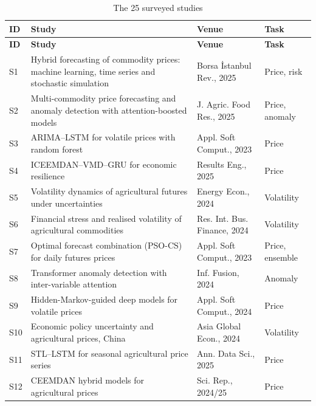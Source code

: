 {\footnotesize\setlength{\tabcolsep}{4pt}\renewcommand{\arraystretch}{1.15}
\begin{longtable}{|p{0.9cm}|p{7.7cm}|p{4.2cm}|p{2.7cm}|}
\caption{The 25 surveyed studies}\label{tab:survey-overview}\\
\hline \textbf{ID} & \textbf{Study} & \textbf{Venue} & \textbf{Task} \\ \hline \endfirsthead
\hline \textbf{ID} & \textbf{Study} & \textbf{Venue} & \textbf{Task} \\ \hline \endhead
\hline \endfoot
S1 & Hybrid forecasting of commodity prices: machine learning, time series and stochastic simulation~\cite{celik2025} & Borsa \.Istanbul Rev., 2025 & Price, risk \\ \hline
S2 & Multi-commodity price forecasting and anomaly detection with attention-boosted models~\cite{sediyono2025} & J. Agric. Food Res., 2025 & Price, anomaly \\ \hline
S3 & ARIMA--LSTM for volatile prices with random forest~\cite{ray2023} & Appl. Soft Comput., 2023 & Price \\ \hline
S4 & ICEEMDAN--VMD--GRU for economic resilience~\cite{sathe2025} & Results Eng., 2025 & Price \\ \hline
S5 & Volatility dynamics of agricultural futures under uncertainties~\cite{fiszeder2024} & Energy Econ., 2024 & Volatility \\ \hline
S6 & Financial stress and realised volatility of agricultural commodities~\cite{algirdas2024} & Res. Int. Bus. Finance, 2024 & Volatility \\ \hline
S7 & Optimal forecast combination (PSO-CS) for daily futures prices~\cite{zeng2023} & Appl. Soft Comput., 2023 & Price, ensemble \\ \hline
S8 & Transformer anomaly detection with inter-variable attention~\cite{tranad2024} & Inf. Fusion, 2024 & Anomaly \\ \hline
S9 & Hidden-Markov-guided deep models for volatile prices~\cite{avinash2024} & Appl. Soft Comput., 2024 & Price \\ \hline
S10 & Economic policy uncertainty and agricultural prices, China~\cite{epu2024} & Asia Global Econ., 2024 & Volatility \\ \hline
S11 & STL--LSTM for seasonal agricultural price series~\cite{jaiswal2025} & Ann. Data Sci., 2025 & Price \\ \hline
S12 & CEEMDAN hybrid models for agricultural prices~\cite{ceemdan2024} & Sci. Rep., 2024/25 & Price \\ \hline

\end{longtable}}
